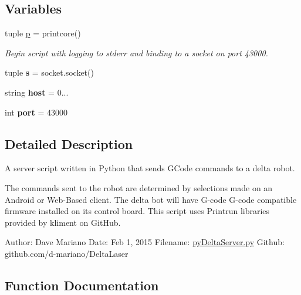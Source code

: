 \subsection*{Variables}
\begin{DoxyCompactItemize}
\item 
tuple \hyperlink{namespacepy_delta_server_a9f57f27f471bef1c4947e6e03b515430}{p} = printcore()
\begin{DoxyCompactList}\small\item\em Begin script with logging to stderr and binding to a socket on port 43000. \end{DoxyCompactList}\item 
\hypertarget{namespacepy_delta_server_a882b3575b268133fed6416e13b268c88}{}tuple {\bfseries s} = socket.\+socket()\label{namespacepy_delta_server_a882b3575b268133fed6416e13b268c88}

\item 
\hypertarget{namespacepy_delta_server_a39fc5b159aee4d88b7c94a9928c6bc82}{}string {\bfseries host} = \textquotesingle{}0...\textquotesingle{}\label{namespacepy_delta_server_a39fc5b159aee4d88b7c94a9928c6bc82}

\item 
\hypertarget{namespacepy_delta_server_ae9b0174d8630e9df876a3507ec25c656}{}int {\bfseries port} = 43000\label{namespacepy_delta_server_ae9b0174d8630e9df876a3507ec25c656}

\end{DoxyCompactItemize}


\subsection{Detailed Description}
A server script written in Python that sends G\+Code commands to a delta robot. 

The commands sent to the robot are determined by selections made on an Android or Web-\/\+Based client. The delta bot will have G-\/code G-\/code compatible firmware installed on its control board. This script uses Printrun libraries provided by kliment on Git\+Hub.

Author\+: Dave Mariano Date\+: Feb 1, 2015 Filename\+: \hyperlink{py_delta_server_8py_source}{py\+Delta\+Server.\+py} Github\+: github.\+com/d-\/mariano/\+Delta\+Laser 

\subsection{Function Documentation}
\hypertarget{namespacepy_delta_server_a71d558b4f7c47960fdafb193e3ddfaeb}{}
